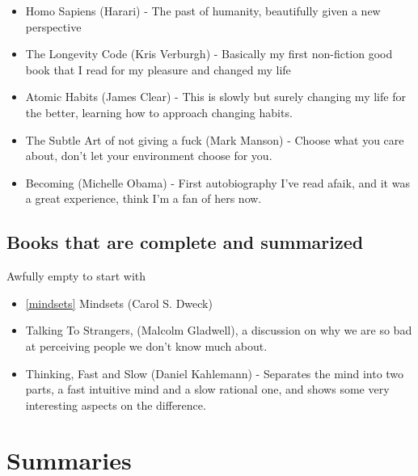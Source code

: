\documentclass[12pt,a4paper]{article} %
\begin{document}
\begin{itemize}
\item Homo Sapiens (Harari) - The past of humanity, beautifully given a new perspective
\item The Longevity Code (Kris Verburgh) - Basically my first non-fiction good book that I read for my pleasure and changed my life
\item Atomic Habits (James Clear) - This is slowly but surely changing my life for the better, learning how to approach changing habits.
\item The Subtle Art of not giving a fuck (Mark Manson) - Choose what you care about, don't let your environment choose for you.
\item Becoming (Michelle Obama) - First autobiography I've read afaik, and it was a great experience, think I'm a fan of hers now.
\end{itemize}

\subsection{Books that are complete and summarized}
Awfully empty to start with
\begin{itemize}
\item \ref{mindsets} Mindsets (Carol S. Dweck)
\item Talking To Strangers, (Malcolm Gladwell), a discussion on why we are so bad at perceiving people we don't know much about.
\item Thinking, Fast and Slow (Daniel Kahlemann) - Separates the mind into two parts, a fast intuitive mind and a slow rational one, and shows some very interesting aspects on the difference.
\end{itemize}


\section{Summaries}






\end{document}
